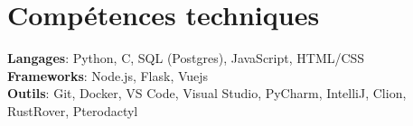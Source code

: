 \documentclass[letterpaper,11pt]{article}
\begin{document}
\vspace{1pt}
%
\section{Compétences techniques}
 \begin{itemize}[leftmargin=0.15in, label={}]
    \small{\item{
     \textbf{Langages}{: Python, C, SQL (Postgres), JavaScript, HTML/CSS} \\
     \textbf{Frameworks}{: Node.js, Flask, Vuejs} \\
     \textbf{Outils}{: Git, Docker, VS Code, Visual Studio, PyCharm, IntelliJ, Clion, RustRover, Pterodactyl} \\
    }}
 \end{itemize}


\end{document}
